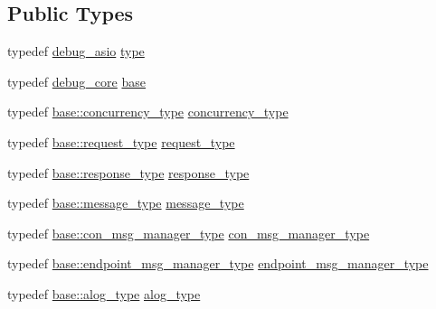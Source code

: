 \subsection*{Public Types}
\begin{DoxyCompactItemize}
\item 
typedef \hyperlink{structwebsocketpp_1_1config_1_1debug__asio}{debug\+\_\+asio} \hyperlink{structwebsocketpp_1_1config_1_1debug__asio_a10a7037cdb25a39e64780105e83147d0}{type}
\item 
typedef \hyperlink{structwebsocketpp_1_1config_1_1debug__core}{debug\+\_\+core} \hyperlink{structwebsocketpp_1_1config_1_1debug__asio_ae2b3c4a01c27b2f26bc98419543744cd}{base}
\item 
typedef \hyperlink{structwebsocketpp_1_1config_1_1debug__core_aada73b9183fc032c25178870dbb4d83d}{base\+::concurrency\+\_\+type} \hyperlink{structwebsocketpp_1_1config_1_1debug__asio_ad3c746d7e71d7414c054a254418b93d1}{concurrency\+\_\+type}
\item 
typedef \hyperlink{structwebsocketpp_1_1config_1_1debug__core_a597de872d5a5b6e9bd2fa1af18ccbbc6}{base\+::request\+\_\+type} \hyperlink{structwebsocketpp_1_1config_1_1debug__asio_a4e52af4648f2afcd527b3e5587d8c8ea}{request\+\_\+type}
\item 
typedef \hyperlink{structwebsocketpp_1_1config_1_1debug__core_aa11255cb23f43afb8884bc464aa5c572}{base\+::response\+\_\+type} \hyperlink{structwebsocketpp_1_1config_1_1debug__asio_ac59f3572fc37e0ebe1ffbfcd4d4f006b}{response\+\_\+type}
\item 
typedef \hyperlink{structwebsocketpp_1_1config_1_1debug__core_ac17c81ad59c265eed87e3e25944c9fbf}{base\+::message\+\_\+type} \hyperlink{structwebsocketpp_1_1config_1_1debug__asio_aaf34fbc85d12c93050cb41bc5c4cdbda}{message\+\_\+type}
\item 
typedef \hyperlink{structwebsocketpp_1_1config_1_1debug__core_a7054f79ccb00e2269e3c9fa1061126ac}{base\+::con\+\_\+msg\+\_\+manager\+\_\+type} \hyperlink{structwebsocketpp_1_1config_1_1debug__asio_a81c47526ef346c02dd630dbb5ed7a81e}{con\+\_\+msg\+\_\+manager\+\_\+type}
\item 
typedef \hyperlink{structwebsocketpp_1_1config_1_1debug__core_a02b1cc8ce11213011104049aeba57866}{base\+::endpoint\+\_\+msg\+\_\+manager\+\_\+type} \hyperlink{structwebsocketpp_1_1config_1_1debug__asio_a55481a7cdef8ea9aef21c4498abf5544}{endpoint\+\_\+msg\+\_\+manager\+\_\+type}
\item 
typedef \hyperlink{structwebsocketpp_1_1config_1_1debug__core_a2e57e38001385110ce0fbbd17af6b0af}{base\+::alog\+\_\+type} \hyperlink{structwebsocketpp_1_1config_1_1debug__asio_a08d4d37527b8126eebf4baf4b277e04f}{alog\+\_\+type}

\end{DoxyCompactItemize}
